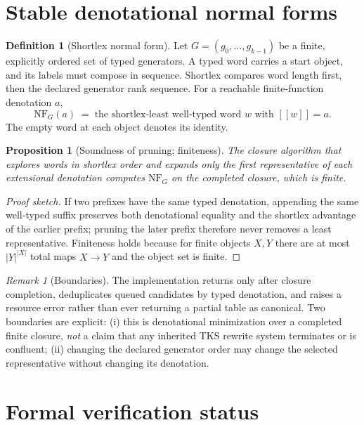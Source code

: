 \documentclass[11pt]{amsart}
\newtheorem{proposition}[theorem]{Proposition}
\theoremstyle{definition}
\newtheorem{definition}[theorem]{Definition}
\theoremstyle{remark}
\newtheorem{remark}[theorem]{Remark}
\providecommand{\llbracket}{[\![}
\providecommand{\rrbracket}{]\!]}
\newcommand{\NF}{\mathrm{NF}}
\begin{document}
\section{Stable denotational normal forms}

\begin{definition}[Shortlex normal form]\label{def:nf}
Let $G = (g_0,\ldots,g_{k-1})$ be a finite, explicitly ordered set of typed generators. A typed word carries a start object, and its labels must compose in sequence. Shortlex compares word length first, then the declared generator rank sequence. For a reachable finite-function denotation $a$,
\[
\NF_G(a) \;=\; \text{the shortlex-least well-typed word } w \text{ with } \llbracket w \rrbracket = a .
\]
The empty word at each object denotes its identity.
\end{definition}

\begin{proposition}[Soundness of pruning; finiteness]\label{prop:closure}
The closure algorithm that explores words in shortlex order and expands only the first representative of each extensional denotation computes $\NF_G$ on the completed closure, which is finite.
\end{proposition}

\begin{proof}[Proof sketch]
If two prefixes have the same typed denotation, appending the same well-typed suffix preserves both denotational equality and the shortlex advantage of the earlier prefix; pruning the later prefix therefore never removes a least representative. Finiteness holds because for finite objects $X,Y$ there are at most $|Y|^{|X|}$ total maps $X \to Y$ and the object set is finite.
\end{proof}

\begin{remark}[Boundaries]
The implementation returns only after closure completion, deduplicates queued candidates by typed denotation, and raises a resource error rather than ever returning a partial table as canonical. Two boundaries are explicit: (i) this is denotational minimization over a completed finite closure, \emph{not} a claim that any inherited TKS rewrite system terminates or is confluent; (ii) changing the declared generator order may change the selected representative without changing its denotation.
\end{remark}

\section{Formal verification status}
\end{document}
